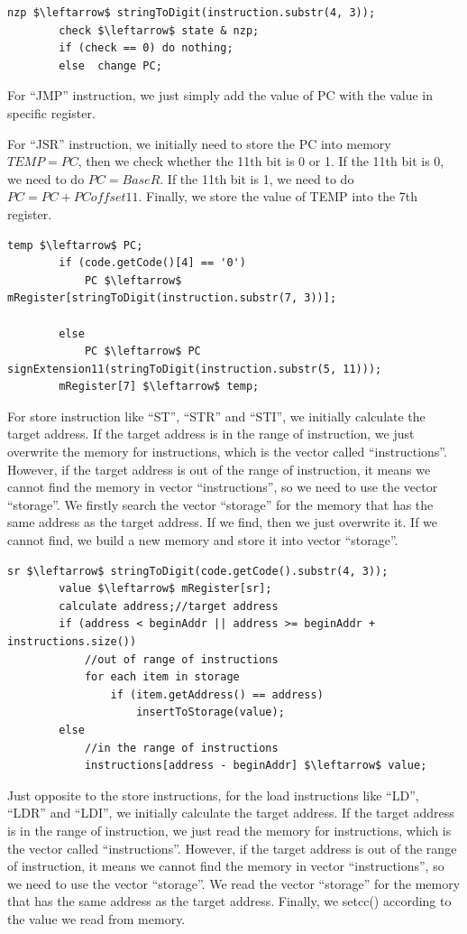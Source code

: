 \documentclass[twoside]{article}
\begin{document}
\begin{CJK*}{UTF8}{gbsn}
	\begin{lstlisting}[mathescape=true]
		nzp $\leftarrow$ stringToDigit(instruction.substr(4, 3));
		check $\leftarrow$ state & nzp;
		if (check == 0) do nothing;
		else  change PC;
	\end{lstlisting}

	For ``JMP'' instruction, we just simply add the value of PC with the value in specific register.
	
	For ``JSR'' instruction, we initially need to store the PC into memory $TEMP = PC$, then we check whether the 11th bit is 0 or 1. If the 11th bit is 0, we need to do $PC = BaseR$. If the 11th bit is 1, we need to do $PC = PC + PCoffset11$. Finally, we store the value of TEMP into the 7th register.
	
	\begin{lstlisting}[mathescape=true]
		temp $\leftarrow$ PC;
		if (code.getCode()[4] == '0') 
			PC $\leftarrow$ mRegister[stringToDigit(instruction.substr(7, 3))];
		
		else 
			PC $\leftarrow$ PC signExtension11(stringToDigit(instruction.substr(5, 11)));
		mRegister[7] $\leftarrow$ temp;
	\end{lstlisting}

	For store instruction like ``ST'', ``STR'' and ``STI'', we initially calculate the target address. If the target address is in the range of instruction, we just overwrite the memory for instructions, which is the vector called ``instructions''. However, if the target address is out of the range of instruction, it means we cannot find the memory in vector ``instructions'', so we need to use the vector ``storage''. We firstly search the vector ``storage'' for the memory that has the same address as the target address. If we find, then we just overwrite it. If we cannot find, we build a new memory and store it into vector ``storage''.
	
	\begin{lstlisting}[mathescape=true]
		sr $\leftarrow$ stringToDigit(code.getCode().substr(4, 3));
		value $\leftarrow$ mRegister[sr];
		calculate address;//target address
		if (address < beginAddr || address >= beginAddr + instructions.size()) 
			//out of range of instructions
			for each item in storage
				if (item.getAddress() == address) 
					insertToStorage(value);
		else 
			//in the range of instructions
			instructions[address - beginAddr] $\leftarrow$ value;
	\end{lstlisting}

	Just opposite to the store instructions, for the load instructions like ``LD'', ``LDR'' and ``LDI'', we initially calculate the target address. If the target address is in the range of instruction, we just read the memory for instructions, which is the vector called ``instructions''. However, if the target address is out of the range of instruction, it means we cannot find the memory in vector ``instructions'', so we need to use the vector ``storage''. We read the vector ``storage'' for the memory that has the same address as the target address. Finally, we setcc() according to the value we read from memory. 
	

\end{CJK*}
\end{document}
